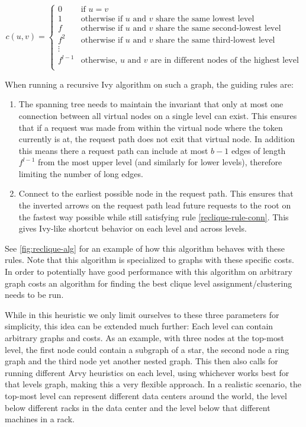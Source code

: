 \documentclass[a4paper, oneside]{discothesis}
\begin{document}
\begin{equation}
c(u,v)=\begin{cases}
0 & \text{if $u=v$} \\
1 & \text{otherwise if $u$ and $v$ share the same lowest level} \\
f & \text{otherwise if $u$ and $v$ share the same second-lowest level} \\
f^2 & \text{otherwise if $u$ and $v$ share the same third-lowest level} \\
\vdots & \\
f^{l-1} & \text{otherwise, $u$ and $v$ are in different nodes of the highest level} \\
\end{cases}
\end{equation}

When running a recursive Ivy algorithm on such a graph, the guiding rules are:
\begin{enumerate}
\item\label{reclique-invariant} The spanning tree needs to maintain the invariant that only at most one connection between all virtual nodes on a single level can exist. This ensures that if a request was made from within the virtual node where the token currently is at, the request path does not exit that virtual node. In addition this means there a request path can include at most $b-1$ edges of length $f^{l-1}$ from the most upper level (and similarly for lower levels), therefore limiting the number of long edges.
\label{reclique-rule-conn}
\item Connect to the earliest possible node in the request path. This ensures that the inverted arrows on the request path lead future requests to the root on the fastest way possible while still satisfying rule \ref{reclique-rule-conn}. This gives Ivy-like shortcut behavior on each level and across levels.
\label{reclique-rule-early}
\end{enumerate}

See \autoref{fig:reclique-alg} for an example of how this algorithm behaves with these rules. Note that this algorithm is specialized to graphs with these specific costs. In order to potentially have good performance with this algorithm on arbitrary graph costs an algorithm for finding the best clique level assignment/clustering needs to be run.

While in this heuristic we only limit ourselves to these three parameters for simplicity, this idea can be extended much further: Each level can contain arbitrary graphs and costs. As an example, with three nodes at the top-most level, the first node could contain a subgraph of a star, the second node a ring graph and the third node yet another nested graph. This then also calls for running different Arvy heuristics on each level, using whichever works best for that levels graph, making this a very flexible approach. In a realistic scenario, the top-most level can represent different data centers around the world, the level below different racks in the data center and the level below that different machines in a rack.
\end{document}
